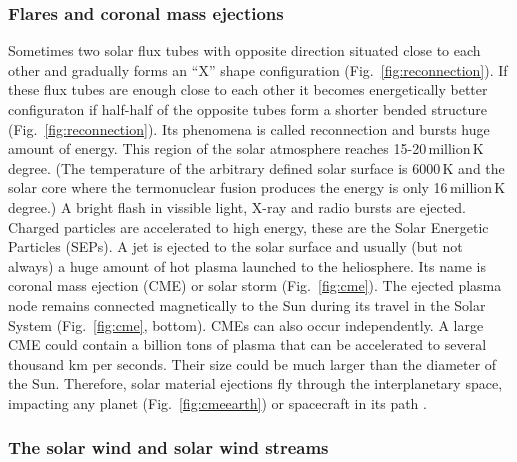 \documentclass[sn-aps]{sn-jnl}%
\begin{document}
\subsubsection{Flares and coronal mass ejections}
\label{sec:cme}

Sometimes two solar flux tubes with opposite direction situated close to each other and gradually forms an ``X'' shape configuration (Fig.~\ref{fig:reconnection}). If these flux tubes are enough close to each other it becomes energetically better configuraton if half-half of the opposite tubes form a shorter bended structure (Fig.~\ref{fig:reconnection}). Its phenomena is called reconnection and bursts huge amount of energy. This region of the solar atmosphere reaches 15-20\,million\,K degree. (The temperature of the arbitrary defined solar surface is 6000\,K and the solar core where the termonuclear fusion produces the energy is only 16\,million\,K degree.) A bright flash in vissible light, X-ray and radio bursts are ejected. Charged particles are accelerated to high energy, these are the Solar Energetic Particles (SEPs). A jet is ejected to the solar surface and usually (but not always) a huge amount of hot plasma launched to the heliosphere. Its name is coronal mass ejection (CME) or solar storm (Fig.~\ref{fig:cme}). The ejected plasma node remains connected magnetically to the Sun during its travel in the Solar System (Fig.~\ref{fig:cme}, bottom). CMEs can also occur independently. A large CME could contain a billion tons of plasma that can be accelerated to several thousand km per seconds. Their size could be much larger than the diameter of the Sun. Therefore, solar material ejections fly through the interplanetary space, impacting any planet (Fig.~\ref{fig:cmeearth}) or spacecraft in its path \cite{scherer05:_space_weath,stix04:_sun_introd}.

\subsubsection{The solar wind and solar wind streams}
\label{sec:sw}
\end{document}
